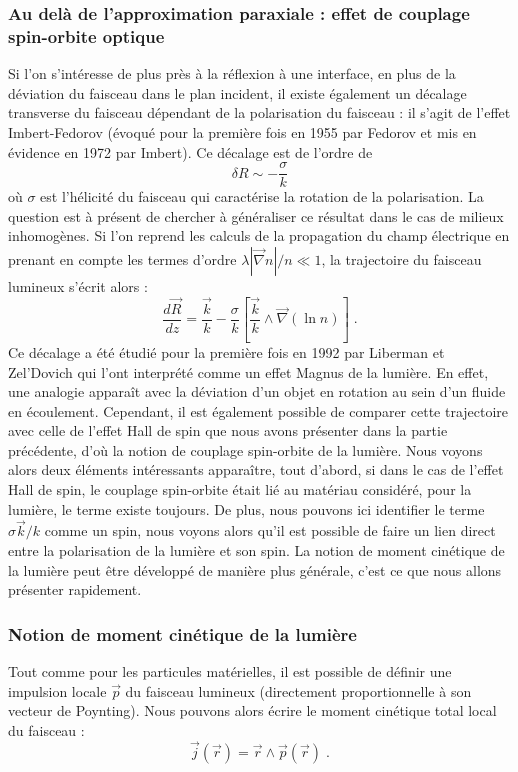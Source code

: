 \documentclass[a4paper,11pt]{article} %
\begin{document}
	\subsubsection{Au delà de l'approximation paraxiale : effet de couplage spin-orbite optique}
	
	Si l'on s'intéresse de plus près à la réflexion à une interface, en plus de la déviation du faisceau dans le plan incident, il existe également un décalage transverse du faisceau dépendant de la polarisation du faisceau : il s'agit de l'effet Imbert-Fedorov (évoqué pour la première fois en 1955 par Fedorov et mis en évidence en 1972 par Imbert). Ce décalage est de l'ordre de
	\begin{equation*}
		\delta R \sim - \frac{\sigma}{k}
	\end{equation*}
	où $ \sigma $ est l'hélicité du faisceau qui caractérise la rotation de la polarisation. La question est à présent de chercher à généraliser ce résultat dans le cas de milieux inhomogènes. Si l'on reprend les calculs de la propagation du champ électrique en prenant en compte les termes d'ordre $ \lambda | \vec{\nabla}n | / n \ll 1$, la trajectoire du faisceau lumineux s'écrit alors :
	\begin{equation}
		\frac{d \vec{R}}{dz} = \frac{\vec{k}}{k} - \frac{\sigma}{k} \left[ \frac{\vec{k}}{k} \wedge \vec{\nabla}(\ln n) \right] \; .
	\end{equation}
	Ce décalage a été étudié pour la première fois en 1992 par Liberman et Zel'Dovich qui l'ont interprété comme un effet Magnus de la lumière. En effet, une analogie apparaît avec la déviation d'un objet en rotation au sein d'un fluide en écoulement. Cependant, il est également possible de comparer cette trajectoire avec celle de l'effet Hall de spin que nous avons présenter dans la partie précédente, d'où la notion de couplage spin-orbite de la lumière. Nous voyons alors deux éléments intéressants apparaître, tout d'abord, si dans le cas de l'effet Hall de spin, le couplage spin-orbite était lié au matériau considéré, pour la lumière, le terme existe toujours. De plus, nous pouvons ici identifier le terme $ \sigma \vec{k} /k $ comme un spin, nous voyons alors qu'il est possible de faire un lien direct entre la polarisation de la lumière et son spin. La notion de moment cinétique de la lumière peut être développé de manière plus générale, c'est ce que nous allons présenter rapidement.
	
	\subsubsection{Notion de moment cinétique de la lumière}
	Tout comme pour les particules matérielles, il est possible de définir une impulsion locale $ \vec{p} $ du faisceau lumineux (directement proportionnelle à son vecteur de Poynting). Nous pouvons alors écrire le moment cinétique total local du faisceau :
	\begin{equation*}
		\vec{j}(\vec{r}) = \vec{r} \wedge \vec{p}(\vec{r}) \; .
	\end{equation*}
	
\end{document}
